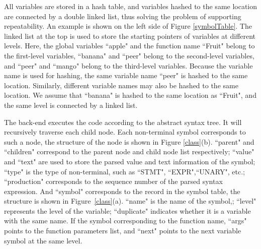 \documentclass[runningheads]{llncs}
\begin{document}
All variables are stored in a hash table, and variables hashed to the same location are connected by a double linked list, thus solving the problem of supporting repeatability. An example is shown on the left side of Figure \ref{symbolTable}. The linked list at the top is used to store the starting pointers of variables at different levels. Here, the global variables ``apple" and the function name ``Fruit" belong to the first-level variables, ``banana" and ``peer" belong to the second-level variables, and ``peer" and ``mango" belong to the third-level variables. Because the variable name is used for hashing, the same variable name ``peer" is hashed to the same location. Similarly, different variable names may also be hashed to the same location. We assume that ``banana" is hashed to the same location as ``Fruit", and the same level is connected by a linked list.

The back-end executes the code according to the abstract syntax tree. It will recursively traverse each child node. Each non-terminal symbol corresponds to such a node, the structure of the node is shown in Figure \ref{class}(b). ``parent" and ``children" correspond to the parent node and child node list respectively; ``value" and ``text" are used to store the parsed value and text information of the symbol; ``type" is the type of non-terminal, such as ``STMT", ``EXPR",``UNARY", etc.; ``production" corresponds to the sequence number of the parsed syntax expression. And ``symbol" corresponds to the record in the symbol table, the structure is shown in Figure~\ref{class}(a). ``name" is the name of the symbol,; ``level" represents the level of the variable; ``duplicate" indicates whether it is a variable with the same name. If the symbol corresponding to the function name, ``args" points to the function parameters list, and ``next" points to the next variable symbol at the same level.
\end{document}
